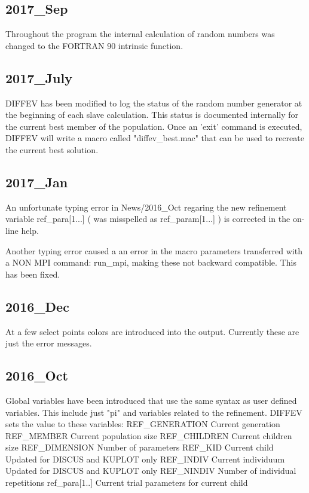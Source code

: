 \subsection*{2017\_Sep}
\par
Throughout the program the internal calculation of random numbers 
was changed to the FORTRAN 90 intrinsic function. 
\subsection*{2017\_July}
DIFFEV has been modified to log the status of the random number generator 
at the beginning of each slave calculation. This status is documented 
internally for the current best member of the population. Once an 'exit' 
command is executed, DIFFEV will write a macro called "diffev\_best.mac" 
that can be used to recreate the current best solution. 
\subsection*{2017\_Jan}
An unfortunate typing error in News/2016\_Oct regaring the new 
refinement variable 
ref\_para[1...]   ( was misspelled as ref\_param[1...] ) 
is corrected in the  on-line help. 
\par
Another typing error caused a an error in the macro parameters 
transferred with a NON MPI command: run\_mpi, making these 
not backward compatible. This has been fixed. 
\subsection*{2016\_Dec}
\par
At a few select points colors are introduced into the output. 
Currently these are just the error messages. 
\par
\subsection*{2016\_Oct}
\par
Global variables have been introduced that use the same syntax as 
user defined variables. This include just "pi" and variables related 
to the refinement. 
DIFFEV sets the value to these variables: 
REF\_GENERATION  Current generation 
REF\_MEMBER      Current population size 
REF\_CHILDREN    Current children size 
REF\_DIMENSION   Number of parameters 
REF\_KID         Current child Updated for DISCUS and KUPLOT only 
REF\_INDIV       Current individuum Updated for DISCUS and KUPLOT only 
REF\_NINDIV      Number of individual repetitions 
ref\_para[1..]   Current trial parameters for current child 
